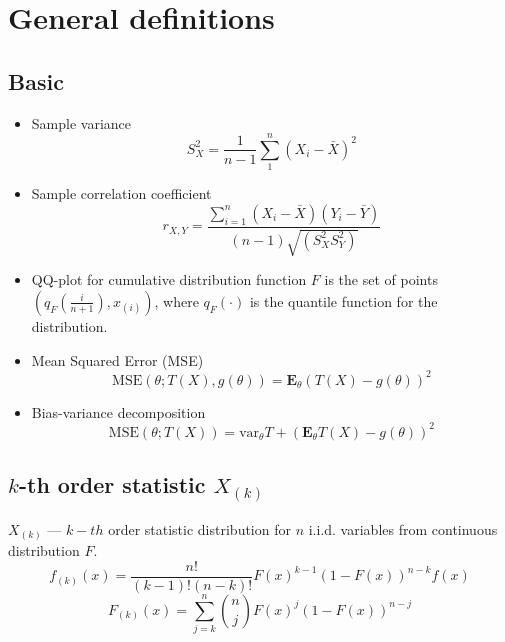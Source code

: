 \documentclass[12pt]{article}
\begin{document}
\section{General definitions}

\subsection{Basic}

\begin{itemize}
\item
Sample variance
\begin{equation}
S_X^2 = \frac 1{n-1}\sum_1^n(X_i - \bar X)^2
\end{equation}

\item
Sample correlation coefficient
\begin{equation}
r_{X,Y} = \frac{\sum_{i = 1}^{n}(X_i-\bar{X})(Y_i-\bar{Y})}{(n-1)\sqrt{(S_X^2S_Y^2)}}
\end{equation}

\item
QQ-plot for cumulative distribution function $F$ is the set of points $\left(q_F\left(\frac i {n+1}\right), x_{(i)}\right)$, where $q_F(\cdot)$ is the quantile function for the distribution.

\item Mean Squared Error (MSE)
\begin{equation}
	\text{MSE}(\theta; T(X), g(\theta)) = \textbf{E}_\theta\left(T(X) - g(\theta)\right)^2
\end{equation}

\item
Bias-variance decomposition
\begin{equation}
\text{MSE}(\theta; T(X)) = \text{var}_\theta T + \left(\textbf{E}_\theta T(X) - g(\theta)\right)^2
\end{equation}

\end{itemize}

\subsection {$k$-th order statistic $X_{(k)}$}
$X_{(k)}$ --- $k-th$ order statistic distribution for $n$ i.i.d. variables from continuous distribution $F$.
\begin{equation}\label{kth_order_pdf}
	f_{(k)}(x) = \frac{n!}{(k-1)!(n-k)!}F(x)^{k-1}(1-F(x))^{n-k}f(x)
\end{equation}
\begin{equation}\label{kth_order_cdf}
	F_{(k)}(x) = \sum_{j = k}^n {{n}\choose{j}}F(x)^j (1-F(x))^{n-j}
\end{equation}
\end{document}
